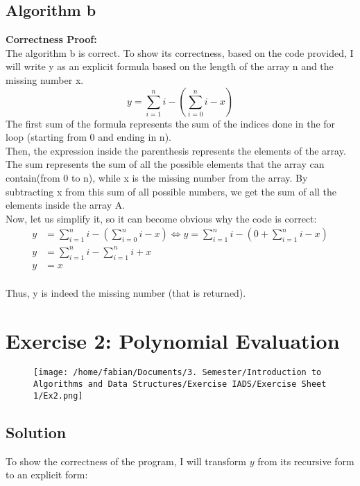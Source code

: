 \documentclass[a4paper,11pt]{article}
\begin{document}
	\subsection*{Algorithm b}
	\textbf{Correctness Proof:} \\
	The algorithm b is correct. To show its correctness, based on the code provided, I will write y as an explicit formula based on the length of the array n and the missing number x. \\
	\[
	y = \sum_{i=1}^{n}i - (\sum_{i=0}^{n}i - x)
	\]
	The first sum of the formula represents the sum of the indices done in the for loop (starting from 0 and ending in n). \\
	Then, the expression inside the parenthesis represents the elements of the array. The sum represents the sum of all the possible elements that the array can contain(from 0 to n), while x is the missing number from the array. By subtracting x from this sum of all possible numbers, we get the sum of all the elements inside the array A. \\
	Now, let us simplify it, so it can become obvious why the code is correct:
	\begin{align*}
		y &= \sum_{i=1}^{n}i - (\sum_{i=0}^{n}i - x) \Leftrightarrow y = \sum_{i=1}^{n}i - (0 + \sum_{i=1}^{n}i - x) \\
		y &= \sum_{i=1}^{n}i - \sum_{i=1}^{n}i + x 	\\
		y &= x 	\\
	\end{align*}
	
	Thus, y is indeed the missing number (that is returned).

	\newpage
	
	\section*{Exercise 2: Polynomial Evaluation}
	
	\begin{figure}[htpb]
		\centering
		\texttt{[image: /home/fabian/Documents/3. Semester/Introduction to Algorithms and Data Structures/Exercise IADS/Exercise Sheet 1/Ex2.png]}
	\end{figure}
	
	\subsection*{Solution}
	
	To show the correctness of the program, I will transform \(y\) from its recursive form to an explicit form:
	
\end{document}
